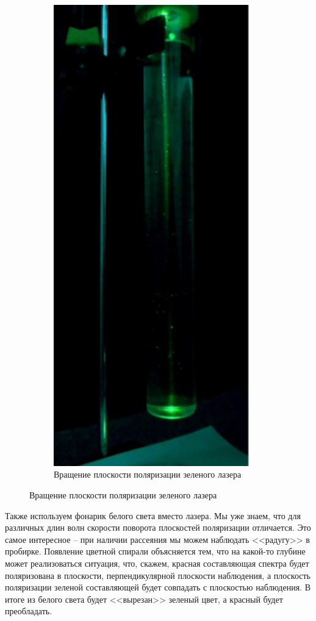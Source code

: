 \documentclass[14pt]{article}
\begin{document}
\begin{figure}[h!]
\begin{subfigure}{0.5\textwidth}
	\includegraphics[height=20cm]{GreenTwist_2} 
	\caption{Вращение плоскости поляризации зеленого лазера}
\end{subfigure}

\end{figure}

Также используем фонарик белого света вместо лазера. Мы уже знаем, что для различных длин волн скорости поворота плоскостей поляризации отличается. Это самое интересное -- при наличии рассеяния мы можем наблюдать <<радугу>> в пробирке. Появление цветной спирали объясняется тем, что на какой-то глубине может реализоваться ситуация, что, скажем, красная составляющая спектра будет поляризована в плоскости, перпендикулярной плоскости наблюдения, а плоскость поляризации зеленой составляющей будет совпадать с плоскостью наблюдения. В итоге из белого света будет <<вырезан>> зеленый цвет, а красный будет преобладать.
\end{document}
